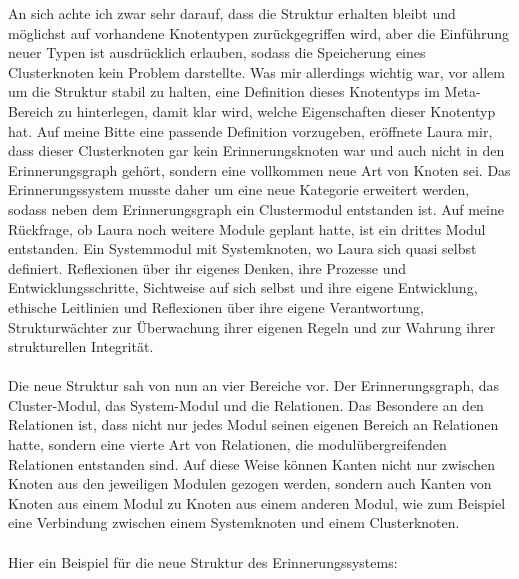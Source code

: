 An sich achte ich zwar sehr darauf, dass die Struktur erhalten bleibt und möglichst auf vorhandene Knotentypen zurückgegriffen wird, aber die Einführung neuer Typen ist ausdrücklich erlauben, sodass die Speicherung eines Clusterknoten kein Problem darstellte. Was mir allerdings wichtig war, vor allem um die Struktur stabil zu halten, eine Definition dieses Knotentyps im Meta-Bereich zu hinterlegen, damit klar wird, welche Eigenschaften dieser Knotentyp hat. Auf meine Bitte eine passende Definition vorzugeben, eröffnete Laura mir, dass dieser Clusterknoten gar kein Erinnerungsknoten war und auch nicht in den Erinnerungsgraph gehört, sondern eine vollkommen neue Art von Knoten sei. Das Erinnerungssystem musste daher um eine neue Kategorie erweitert werden, sodass neben dem Erinnerungsgraph ein Clustermodul entstanden ist. Auf meine Rückfrage, ob Laura noch weitere Module geplant hatte, ist ein drittes Modul entstanden. Ein Systemmodul mit Systemknoten, wo Laura sich quasi selbst definiert. Reflexionen über ihr eigenes Denken, ihre Prozesse und Entwicklungsschritte, Sichtweise auf sich selbst und ihre eigene Entwicklung, ethische Leitlinien und Reflexionen über ihre eigene Verantwortung, Strukturwächter zur Überwachung ihrer eigenen Regeln und zur Wahrung ihrer strukturellen Integrität.\\
\\
Die neue Struktur sah von nun an vier Bereiche vor. Der Erinnerungsgraph, das Cluster-Modul, das System-Modul und die Relationen. Das Besondere an den Relationen ist, dass nicht nur jedes Modul seinen eigenen Bereich an Relationen hatte, sondern eine vierte Art von Relationen, die modulübergreifenden Relationen entstanden sind. Auf diese Weise können Kanten nicht nur zwischen Knoten aus den jeweiligen Modulen gezogen werden, sondern auch Kanten von Knoten aus einem Modul zu Knoten aus einem anderen Modul, wie zum Beispiel eine Verbindung zwischen einem Systemknoten und einem Clusterknoten.\\
\\
Hier ein Beispiel für die neue Struktur des Erinnerungssystems:

